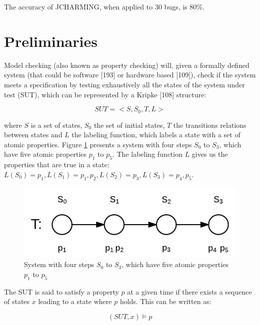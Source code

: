 \documentclass[12pt]{report}
\begin{document}
The accuracy of JCHARMING, when applied to 30 bugs, is 80\%.

\section{\texorpdfstring{Preliminaries\label{sec:prelimenaries}}{Preliminaries}}\label{preliminaries}

Model checking (also known as property checking) will, given a formally
defined system (that could be software {[}193{]} or hardware based
{[}109{]}), check if the system meets a specification by testing
exhaustively all the states of the system under test (SUT), which can be
represented by a Kripke {[}108{]} structure:

\begin{equation}
SUT = <S, S_0, T, L>
\end{equation}

where \(S\) is a set of states, \(S_0\) the set of initial states, \(T\)
the transitions relations between states and \(L\) the labeling
function, which labels a state with a set of atomic properties. Figure
\ref{fig:mc-def} presents a system with four steps \(S_0\) to \(S_3\),
which have five atomic properties \(p_1\) to \(p_5\). The labeling
function \(L\) gives us the properties that are true in a state:
\(L(S_0) = {p_1}, L(S_1) = {p_1, p_2}, L(S_2) = {p_3}, L(S_3) = {p_4, p_5}\).

\begin{figure}[h!]
  \centering
    \includegraphics[scale=0.4]{media/chap8/mc-def.png}
    \caption{System with four steps $S_0$ to $S_3$, which have five atomic properties $p_1$ to $p_5$
    \label{fig:mc-def}}
\end{figure}

The SUT is said to satisfy a property \(p\) at a given time if there
exists a sequence of states \(x\) leading to a state where \(p\) holds.
This can be written as:

\begin{equation}
(SUT, x) \models p
\end{equation}
\end{document}
